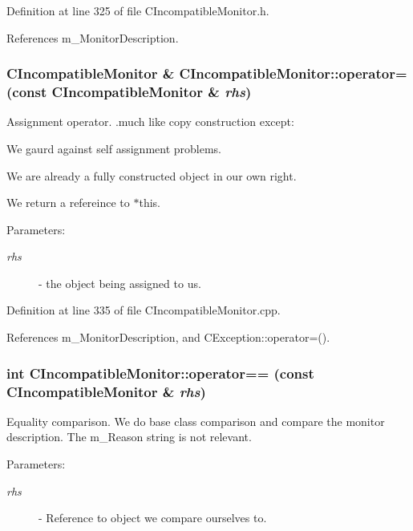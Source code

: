 Definition at line 325 of file CIncompatible\-Monitor.h.

References m\_\-Monitor\-Description.
\subsubsection{\setlength{\rightskip}{0pt plus 5cm}CIncompatible\-Monitor \& CIncompatible\-Monitor::operator= (const CIncompatible\-Monitor \& {\em rhs})}\label{classCIncompatibleMonitor_a3}


Assignment operator. .much like copy construction except:\begin{CompactItemize}
\item 
We gaurd against self assignment problems.\item 
We are already a fully constructed object in our own right.\item 
We return a refereince to $\ast$this.\end{CompactItemize}
\begin{Desc}
\item[Parameters: ]\par
\begin{description}
\item[{\em 
rhs}]- the object being assigned to us. \end{description}
\end{Desc}


Definition at line 335 of file CIncompatible\-Monitor.cpp.

References m\_\-Monitor\-Description, and CException::operator=().
\subsubsection{\setlength{\rightskip}{0pt plus 5cm}int CIncompatible\-Monitor::operator== (const CIncompatible\-Monitor \& {\em rhs})}\label{classCIncompatibleMonitor_a4}


Equality comparison. We do base class comparison and compare the monitor description. The m\_\-Reason string is not relevant.\begin{Desc}
\item[Parameters: ]\par
\begin{description}
\item[{\em 
rhs}]- Reference to object we compare ourselves to. \end{description}
\end{Desc}


